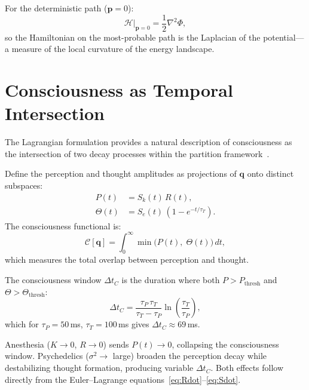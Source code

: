 \documentclass[twocolumn,aps,prl,superscriptaddress,floatfix]{revtex4-2}
\newcommand{\Ham}{\mathcal{H}}
\newcommand{\Pot}{\Phi}
\newcommand{\Sk}{S_k}
\newcommand{\Se}{S_e}
\newcommand{\qvec}{\mathbf{q}}
\newcommand{\tauP}{\tau_P}
\newcommand{\tauT}{\tau_T}
\begin{document}
For the deterministic path ($\mathbf{p} = 0$):
\begin{equation}
\Ham\big|_{\mathbf{p}=0} = \frac{1}{2}\nabla^2\Pot,
\end{equation}
so the Hamiltonian on the most-probable path is the Laplacian of the potential---a measure of the local curvature of the energy landscape.


\section{Consciousness as Temporal Intersection}
\label{sec:consciousness}

The Lagrangian formulation provides a natural description of consciousness as the intersection of two decay processes within the partition framework~\cite{sachikonye2026regime}.

Define the perception and thought amplitudes as projections of $\qvec$ onto distinct subspaces:
\begin{align}
P(t) &= \Sk(t)\,R(t), \\
\Theta(t) &= \Se(t)\,(1 - e^{-t/\tauT}).
\end{align}
The consciousness functional is:
\begin{equation}
\mathcal{C}[\qvec] = \int_0^\infty \min\!\big(P(t),\;\Theta(t)\big)\,dt,
\label{eq:consciousness}
\end{equation}
which measures the total overlap between perception and thought.

The consciousness window $\Delta t_C$ is the duration where both $P > P_{\mathrm{thresh}}$ and $\Theta > \Theta_{\mathrm{thresh}}$:
\begin{equation}
\Delta t_C = \frac{\tauP\,\tauT}{\tauT - \tauP}\ln\!\left(\frac{\tauT}{\tauP}\right),
\end{equation}
which for $\tauP = 50\,$ms, $\tauT = 100\,$ms gives $\Delta t_C \approx 69\,$ms.

Anesthesia ($K \to 0$, $R \to 0$) sends $P(t) \to 0$, collapsing the consciousness window.
Psychedelics ($\sigma^2 \to$ large) broaden the perception decay while destabilizing thought formation, producing variable $\Delta t_C$.
Both effects follow directly from the Euler--Lagrange equations~\eqref{eq:Rdot}--\eqref{eq:Sdot}.


\end{document}

